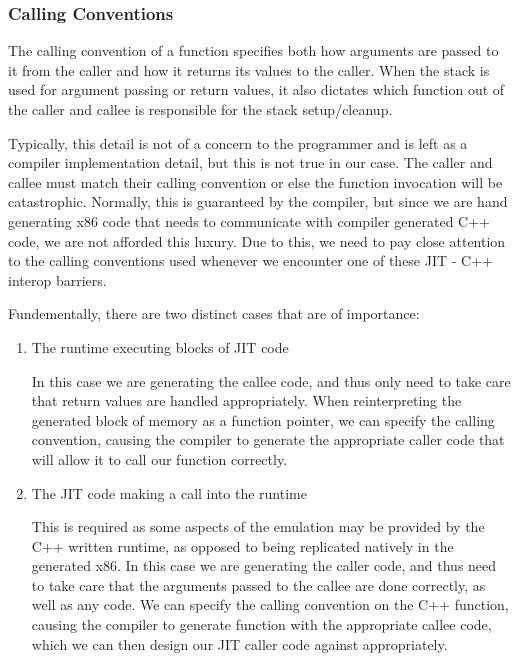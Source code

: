 \subsubsection{Calling Conventions}

The calling convention of a function specifies both how arguments are passed to it from the caller and how it returns its values to the caller. When the stack is used for argument passing or return values, it also dictates which function out of the caller and callee is responsible for the stack setup/cleanup.

Typically, this detail is not of a concern to the programmer and is left as a compiler implementation detail, but this is not true in our case. The caller and callee must match their calling convention or else the function invocation will be catastrophic. Normally, this is guaranteed by the compiler, but since we are hand generating x86 code that needs to communicate with compiler generated C++ code, we are not afforded this luxury. Due to this, we need to pay close attention to the calling conventions used whenever we encounter one of these JIT - C++ interop barriers.

Fundementally, there are two distinct cases that are of importance:
\begin{enumerate}
    \item The runtime executing blocks of JIT code
    
    In this case we are generating the callee code, and thus only need to take care that return values are handled appropriately. When reinterpreting the generated block of memory as a function pointer, we can specify the calling convention, causing the compiler to generate the appropriate caller code that will allow it to call our function correctly.
    
    \item The JIT code making a call into the runtime
    
    This is required as some aspects of the emulation may be provided by the C++ written runtime, as opposed to being replicated natively in the generated x86. In this case we are generating the caller code, and thus need to take care that the arguments passed to the callee are done correctly, as well as any  code. We can specify the calling convention on the C++ function, causing the compiler to generate function with the appropriate callee code, which we can then design our JIT caller code against appropriately.
\end{enumerate}

